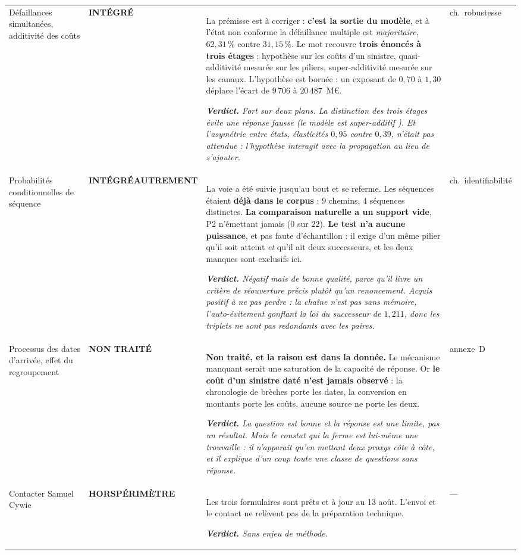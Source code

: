 \documentclass[11pt,a4paper]{article}
\newcommand{\ok}{\cellcolor{vert}\footnotesize\textbf{INTÉGRÉ}}
\newcommand{\autrement}{\cellcolor{vert}\footnotesize\textbf{INTÉGRÉ}\newline\footnotesize\textbf{AUTREMENT}}
\newcommand{\non}{\cellcolor{rouge}\footnotesize\textbf{NON TRAITÉ}}
\newcommand{\toi}{\cellcolor{gris}\footnotesize\textbf{HORS}\newline\footnotesize\textbf{PÉRIMÈTRE}}
\newcommand{\verdict}[1]{\par\smallskip\emph{\textbf{Verdict.} #1}}
\begin{document}
{\begin{longtable}{@{}p{3.4cm} >{\raggedright\arraybackslash\hyphenpenalty=10000\exhyphenpenalty=10000}p{2.4cm} p{8.7cm} p{2.0cm}@{}}
Défaillances simultanées, additivité des coûts &
\ok &
La prémisse est à corriger : \textbf{c'est la sortie du modèle}, et à l'état non conforme la
défaillance multiple est \emph{majoritaire}, $62{,}31\,\%$ contre $31{,}15\,\%$. Le mot recouvre
\textbf{trois énoncés à trois étages} : hypothèse sur les coûts d'un sinistre, quasi-additivité
mesurée sur les piliers, super-additivité mesurée sur les canaux. L'hypothèse est bornée : un
exposant de $0{,}70$ à $1{,}30$ déplace l'écart de $9\,706$ à $20\,487$~M\euro.
\verdict{Fort sur deux plans. La distinction des trois étages évite une réponse fausse
(\og le modèle est super-additif \fg). Et l'asymétrie entre états, élasticités $0{,}95$ contre
$0{,}39$, n'était pas attendue : l'hypothèse interagit avec la propagation au lieu de s'ajouter.} &
ch.~robustesse \\

Probabilités conditionnelles de séquence &
\autrement &
La voie a été suivie jusqu'au bout et se referme. Les séquences étaient \textbf{déjà dans le
corpus} : $9$ chemins, $4$ séquences distinctes. \textbf{La comparaison naturelle a un support
vide}, P2 n'émettant jamais ($0$ sur $22$). \textbf{Le test n'a aucune puissance}, et pas faute
d'échantillon : il exige d'un même pilier qu'il soit atteint \emph{et} qu'il ait deux successeurs,
et les deux manques sont exclusifs ici.
\verdict{Négatif mais de bonne qualité, parce qu'il livre un \emph{critère de réouverture} précis
plutôt qu'un renoncement. Acquis positif à ne pas perdre : la chaîne n'est pas sans mémoire,
l'auto-évitement gonflant la loi du successeur de $1{,}211$, donc les triplets ne sont pas
redondants avec les paires.} &
ch.~identifiabilité \\

Processus des dates d'arrivée, effet du regroupement &
\non &
\textbf{Non traité, et la raison est dans la donnée.} Le mécanisme manquant serait une saturation
de la capacité de réponse. Or \textbf{le coût d'un sinistre daté n'est jamais observé} : la
chronologie de brèches porte les dates, la conversion en montants porte les coûts, aucune source
ne porte les deux.
\verdict{La question est bonne et la réponse est une limite, pas un résultat. Mais le
\emph{constat} qui la ferme est lui-même une trouvaille : il n'apparaît qu'en mettant deux proxys
côte à côte, et il explique d'un coup toute une classe de questions sans réponse.} &
annexe~D \\

Contacter Samuel Cywie &
\toi &
Les trois formulaires sont prêts et à jour au 13 août. L'envoi et le contact ne relèvent pas de la
préparation technique.
\verdict{Sans enjeu de méthode.} &
--- \\


\end{longtable}}
\end{document}
